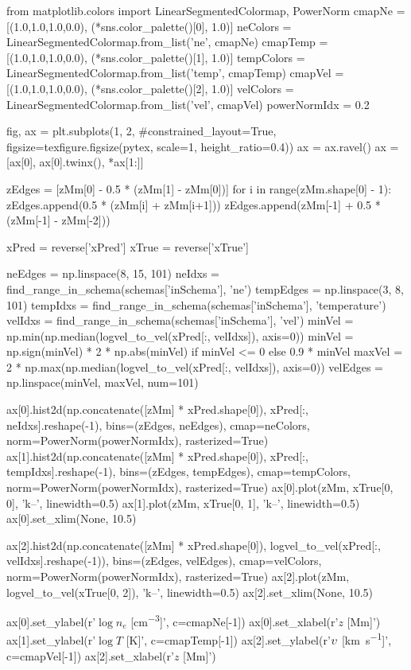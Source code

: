 \begin{pycode}[Radynversion]
from matplotlib.colors import LinearSegmentedColormap, PowerNorm
cmapNe = [(1.0,1.0,1.0,0.0), (*sns.color_palette()[0], 1.0)]
neColors = LinearSegmentedColormap.from_list('ne', cmapNe)
cmapTemp = [(1.0,1.0,1.0,0.0), (*sns.color_palette()[1], 1.0)]
tempColors = LinearSegmentedColormap.from_list('temp', cmapTemp)
cmapVel = [(1.0,1.0,1.0,0.0), (*sns.color_palette()[2], 1.0)]
velColors = LinearSegmentedColormap.from_list('vel', cmapVel)
powerNormIdx = 0.2

fig, ax = plt.subplots(1, 2, #constrained_layout=True,
                       figsize=texfigure.figsize(pytex, scale=1, height_ratio=0.4))
ax = ax.ravel()
ax = [ax[0], ax[0].twinx(), *ax[1:]]

zEdges = [zMm[0] - 0.5 * (zMm[1] - zMm[0])]
for i in range(zMm.shape[0] - 1):
    zEdges.append(0.5 * (zMm[i] + zMm[i+1]))
zEdges.append(zMm[-1] + 0.5 * (zMm[-1] - zMm[-2]))

xPred = reverse['xPred']
xTrue = reverse['xTrue']

neEdges = np.linspace(8, 15, 101)
neIdxs = find_range_in_schema(schemas['inSchema'], 'ne')
tempEdges = np.linspace(3, 8, 101)
tempIdxs = find_range_in_schema(schemas['inSchema'], 'temperature')
velIdxs = find_range_in_schema(schemas['inSchema'], 'vel')
minVel = np.min(np.median(logvel_to_vel(xPred[:, velIdxs]), axis=0))
minVel = np.sign(minVel) * 2 * np.abs(minVel) if minVel <= 0 else 0.9 * minVel
maxVel = 2 * np.max(np.median(logvel_to_vel(xPred[:, velIdxs]), axis=0))
velEdges = np.linspace(minVel, maxVel, num=101)

ax[0].hist2d(np.concatenate([zMm] * xPred.shape[0]),
             xPred[:, neIdxs].reshape(-1),
             bins=(zEdges, neEdges), cmap=neColors, norm=PowerNorm(powerNormIdx), rasterized=True)
ax[1].hist2d(np.concatenate([zMm] * xPred.shape[0]),
             xPred[:, tempIdxs].reshape(-1),
             bins=(zEdges, tempEdges), cmap=tempColors, norm=PowerNorm(powerNormIdx), rasterized=True)
ax[0].plot(zMm, xTrue[0, 0], 'k--', linewidth=0.5)
ax[1].plot(zMm, xTrue[0, 1], 'k--', linewidth=0.5)
ax[0].set_xlim(None, 10.5)

ax[2].hist2d(np.concatenate([zMm] * xPred.shape[0]),
             logvel_to_vel(xPred[:, velIdxs].reshape(-1)),
             bins=(zEdges, velEdges), cmap=velColors, norm=PowerNorm(powerNormIdx), rasterized=True)
ax[2].plot(zMm, logvel_to_vel(xTrue[0, 2]), 'k--', linewidth=0.5)
ax[2].set_xlim(None, 10.5)


ax[0].set_ylabel(r'$\log{n_e}$ [\si{\cm\tothe{-3}}]', c=cmapNe[-1])
ax[0].set_xlabel(r'$z$ [\si{\mega\metre}]')
ax[1].set_ylabel(r'$\log{T}$ [\si{\K}]', c=cmapTemp[-1])
ax[2].set_ylabel(r'$\upsilon$ [\si{\kilo\metre\per\second}]', c=cmapVel[-1])
ax[2].set_xlabel(r'$z$ [\si{\mega\metre}]')


\end{pycode}
